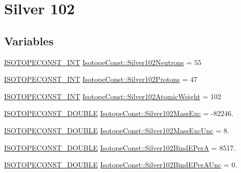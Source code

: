 \hypertarget{group___isotope_const-_silver-_ag102}{}\section{Silver 102}
\label{group___isotope_const-_silver-_ag102}
\subsection*{Variables}
\begin{DoxyCompactItemize}
\item 
\mbox{\hyperlink{group___isotope_const-_macros_ga5f18360b3e99483a35c32d789e62621c}{I\+S\+O\+T\+O\+P\+E\+C\+O\+N\+S\+T\+\_\+\+I\+NT}} \mbox{\hyperlink{group___isotope_const-_silver-_ag102_ga1dad5142ce4715224acaf442f614d98f}{Isotope\+Const\+::\+Silver102\+Neutrons}} = 55
\item 
\mbox{\hyperlink{group___isotope_const-_macros_ga5f18360b3e99483a35c32d789e62621c}{I\+S\+O\+T\+O\+P\+E\+C\+O\+N\+S\+T\+\_\+\+I\+NT}} \mbox{\hyperlink{group___isotope_const-_silver-_ag102_gab89e34be6c6f1ffc5efbb43607a42d96}{Isotope\+Const\+::\+Silver102\+Protons}} = 47
\item 
\mbox{\hyperlink{group___isotope_const-_macros_ga5f18360b3e99483a35c32d789e62621c}{I\+S\+O\+T\+O\+P\+E\+C\+O\+N\+S\+T\+\_\+\+I\+NT}} \mbox{\hyperlink{group___isotope_const-_silver-_ag102_ga01dc23f0bcce9ac08a511f59ba07c1ad}{Isotope\+Const\+::\+Silver102\+Atomic\+Weight}} = 102
\item 
\mbox{\hyperlink{group___isotope_const-_macros_ga8f45a7272ce02c0b4c65c44636ed719a}{I\+S\+O\+T\+O\+P\+E\+C\+O\+N\+S\+T\+\_\+\+D\+O\+U\+B\+LE}} \mbox{\hyperlink{group___isotope_const-_silver-_ag102_ga97b06ed26590112e4aec4bb487f8bbb2}{Isotope\+Const\+::\+Silver102\+Mass\+Exc}} = -\/82246.
\item 
\mbox{\hyperlink{group___isotope_const-_macros_ga8f45a7272ce02c0b4c65c44636ed719a}{I\+S\+O\+T\+O\+P\+E\+C\+O\+N\+S\+T\+\_\+\+D\+O\+U\+B\+LE}} \mbox{\hyperlink{group___isotope_const-_silver-_ag102_ga2e30c02bc14cd4d429eadb75ff5bb13b}{Isotope\+Const\+::\+Silver102\+Mass\+Exc\+Unc}} = 8.
\item 
\mbox{\hyperlink{group___isotope_const-_macros_ga8f45a7272ce02c0b4c65c44636ed719a}{I\+S\+O\+T\+O\+P\+E\+C\+O\+N\+S\+T\+\_\+\+D\+O\+U\+B\+LE}} \mbox{\hyperlink{group___isotope_const-_silver-_ag102_gafe59e4609c696f508282e662f067dbca}{Isotope\+Const\+::\+Silver102\+Bind\+E\+PerA}} = 8517.
\item 
\mbox{\hyperlink{group___isotope_const-_macros_ga8f45a7272ce02c0b4c65c44636ed719a}{I\+S\+O\+T\+O\+P\+E\+C\+O\+N\+S\+T\+\_\+\+D\+O\+U\+B\+LE}} \mbox{\hyperlink{group___isotope_const-_silver-_ag102_ga5024d7015cbec3a52875102b12f7794f}{Isotope\+Const\+::\+Silver102\+Bind\+E\+Per\+A\+Unc}} = 0.

\end{DoxyCompactItemize}
